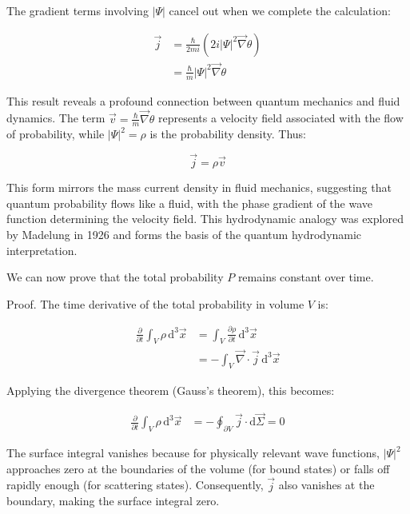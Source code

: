 \documentclass[italian]{HKNdocument}
\begin{document}
The gradient terms involving $|\Psi|$ cancel out when we complete the calculation:

\begin{align}
\vec{j} &= \frac{\hbar}{2 m i}\left(2 i|\Psi|^{2} \vec{\nabla} \theta\right) \\
&= \frac{\hbar}{m}|\Psi|^{2} \vec{\nabla} \theta
\end{align}

This result reveals a profound connection between quantum mechanics and fluid dynamics. The term $\vec{v}=\frac{\hbar}{m} \vec{\nabla} \theta$ represents a velocity field associated with the flow of probability, while $|\Psi|^2 = \rho$ is the probability density. Thus:

\begin{equation}
\vec{j}=\rho \vec{v}
\end{equation}

This form mirrors the mass current density in fluid mechanics, suggesting that quantum probability flows like a fluid, with the phase gradient of the wave function determining the velocity field. This hydrodynamic analogy was explored by Madelung in 1926 and forms the basis of the quantum hydrodynamic interpretation.

We can now prove that the total probability $P$ remains constant over time.

Proof. The time derivative of the total probability in volume $V$ is:

\begin{align}
\frac{\partial}{\partial t} \int_{V} \rho \, \mathrm{d}^{3} \vec{x} &= \int_{V} \frac{\partial \rho}{\partial t} \, \mathrm{d}^{3} \vec{x}  \\
&= -\int_{V} \vec{\nabla} \cdot \vec{j} \, \mathrm{d}^{3} \vec{x}
\end{align}

Applying the divergence theorem (Gauss's theorem), this becomes:

\begin{align}
\frac{\partial}{\partial t} \int_{V} \rho \, \mathrm{d}^{3} \vec{x} &= -\oint_{\partial V} \vec{j} \cdot \mathrm{d} \vec{\Sigma} = 0
\end{align}

The surface integral vanishes because for physically relevant wave functions, $|\Psi|^2$ approaches zero at the boundaries of the volume (for bound states) or falls off rapidly enough (for scattering states). Consequently, $\vec{j}$ also vanishes at the boundary, making the surface integral zero.
\end{document}
